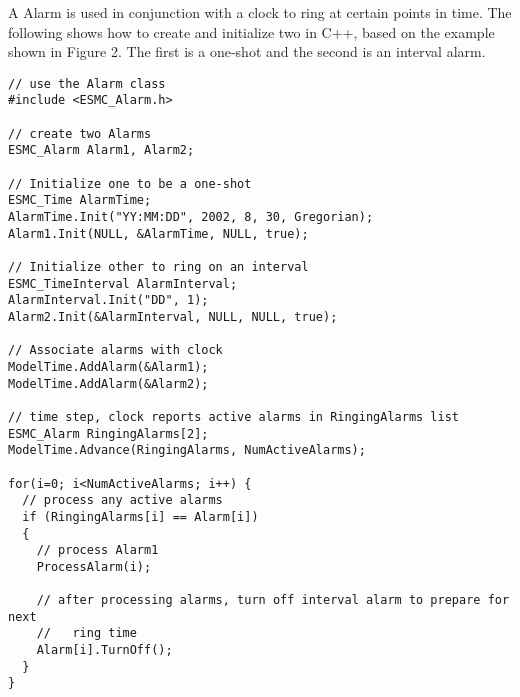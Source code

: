 
A Alarm is used in conjunction with a clock to ring at certain points in time.
The following shows how to create and initialize two in C++, based on the
example shown in Figure 2.  The first is a one-shot and the second is an
interval alarm.

\begin{verbatim}
// use the Alarm class
#include <ESMC_Alarm.h>

// create two Alarms
ESMC_Alarm Alarm1, Alarm2;

// Initialize one to be a one-shot
ESMC_Time AlarmTime;
AlarmTime.Init("YY:MM:DD", 2002, 8, 30, Gregorian);
Alarm1.Init(NULL, &AlarmTime, NULL, true);

// Initialize other to ring on an interval
ESMC_TimeInterval AlarmInterval;
AlarmInterval.Init("DD", 1);
Alarm2.Init(&AlarmInterval, NULL, NULL, true);

// Associate alarms with clock
ModelTime.AddAlarm(&Alarm1);
ModelTime.AddAlarm(&Alarm2);

// time step, clock reports active alarms in RingingAlarms list
ESMC_Alarm RingingAlarms[2];
ModelTime.Advance(RingingAlarms, NumActiveAlarms);

for(i=0; i<NumActiveAlarms; i++) {
  // process any active alarms
  if (RingingAlarms[i] == Alarm[i])
  {
    // process Alarm1
    ProcessAlarm(i);

    // after processing alarms, turn off interval alarm to prepare for next
    //   ring time
    Alarm[i].TurnOff();
  }
}
\end{verbatim}
